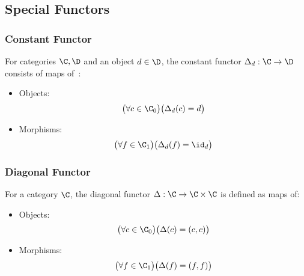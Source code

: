 \subsection{Special Functors}

\subsubsection{Constant Functor}
\begin{definition}
  For categories $\C,\D$ and an object $d\in \D$, the constant functor
  $\Delta_d: \C\to \D$ consists of maps
  of~\parencite[p.~142]{leinster:basic_category_theory}:
  \begin{itemize}
    \item Objects:
      \[\big(\forall c\in \C_0\big)
        \big(\Delta_d(c) = d\big)\]
    \item Morphisms:
      \[\big(\forall f\in \C_1\big)
        \big(\Delta_d(f) = \id_d\big)\]
  \end{itemize}
\end{definition}

\subsubsection{Diagonal Functor}
\begin{definition}\label{def:diagonal_functor_binary}
  For a category $\C$, the diagonal
  functor $\Delta: \C \to \C\times \C$ is defined as maps of:
  \begin{itemize}
    \item Objects:
      \[\big(\forall c\in \C_0\big)
        \big(\Delta(c) = (c,c)\big)\]
    \item Morphisms:
      \[\big(\forall f\in \C_1\big)
        \big(\Delta(f) = (f,f)\big)\]
  \end{itemize}
\end{definition}

